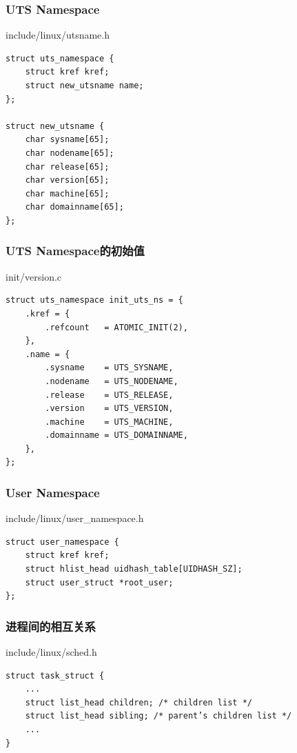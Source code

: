 \documentclass[xcolor=svgnames]{beamer}
\begin{document}
\begin{CJK*}{UTF8}{gbsn}
\begin{frame}[fragile]
\frametitle{UTS Namespace}
\begin{block}{include/linux/utsname.h}
\begin{verbatim}
struct uts_namespace {
    struct kref kref;
    struct new_utsname name;
};

struct new_utsname {
    char sysname[65];
    char nodename[65];
    char release[65];
    char version[65];
    char machine[65];
    char domainname[65];
};
\end{verbatim}
\end{block}
\end{frame}
\begin{frame}[fragile]
\frametitle{UTS Namespace的初始值}
\begin{block}{init/version.c}
\begin{verbatim}
struct uts_namespace init_uts_ns = {
    .kref = {
        .refcount   = ATOMIC_INIT(2),
    },
    .name = {
        .sysname    = UTS_SYSNAME,
        .nodename   = UTS_NODENAME,
        .release    = UTS_RELEASE,
        .version    = UTS_VERSION,
        .machine    = UTS_MACHINE,
        .domainname = UTS_DOMAINNAME,
    },
};
\end{verbatim}
\end{block}
\end{frame}

\begin{frame}[fragile]
\frametitle{User Namespace}
\begin{block}{include/linux/user\_namespace.h}
\begin{verbatim}
struct user_namespace {
    struct kref kref;
    struct hlist_head uidhash_table[UIDHASH_SZ];
    struct user_struct *root_user;
};
\end{verbatim}
\end{block}
\end{frame}

\begin{frame}[fragile]
\frametitle{进程间的相互关系}
\begin{block}{include/linux/sched.h}
\begin{verbatim}
struct task_struct {
    ...
    struct list_head children; /* children list */
    struct list_head sibling; /* parent’s children list */
    ...
}
\end{verbatim}
\end{block}
\end{frame}


\end{CJK*}
\end{document}
